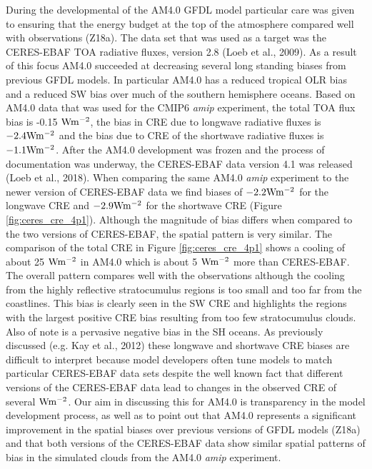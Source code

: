 \documentclass[draft]{agujournal2019}
\begin{document}
During the developmental of the AM4.0 GFDL model particular care was given to ensuring that the energy budget at 
the top of the atmosphere compared well with observations (Z18a).  The data set that was used as a target
was the CERES-EBAF TOA radiative fluxes, version 2.8 (Loeb et al., 2009).  
As a result of this focus AM4.0 succeeded at decreasing several long standing biases from previous GFDL models.  
In particular AM4.0 has a reduced tropical OLR bias and a reduced SW bias over much of the southern hemisphere oceans.   
Based on AM4.0 data that was used for the CMIP6 \textit{amip} experiment, the total TOA flux bias is -0.15 $ \rm{W m^{-2}}$,  %
the bias in CRE due to longwave radiative fluxes is $-2.4 \rm{W m^{-2}} $ and the bias due to CRE of the shortwave radiative fluxes   
is $-1.1 \rm{W m^{-2}} $.  
After the AM4.0 development was frozen and the process of documentation 
was underway, the CERES-EBAF data version 4.1 was released (Loeb et al., 2018).  When comparing the same 
AM4.0 \textit{amip} experiment to the 
newer version of CERES-EBAF data we find biases of $-2.2 \rm{W m^{-2}} $ for the longwave CRE and 
$-2.9 \rm{W m^{-2}} $ for the shortwave CRE (Figure \ref{fig:ceres_cre_4p1}).  Although the magnitude of bias 
differs when compared to the two versions of CERES-EBAF, the spatial pattern is very similar.   
The comparison of the total 
CRE in Figure \ref{fig:ceres_cre_4p1}  shows a cooling of about 25 $\rm{W m^{-2}}$ in AM4.0 which is about 
5 $\rm{W m^{-2}}$ more than CERES-EBAF.  The overall pattern compares
well with the observations although the cooling from the highly reflective stratocumulus regions is too small and
too far from the coastlines. 
This bias is clearly seen in the SW CRE and highlights the regions with the largest
positive CRE bias resulting from too few stratocumulus clouds.  Also of note is a pervasive negative bias in the SH oceans.   
  As previously discussed (e.g. Kay et al., 2012) these longwave and shortwave CRE 
biases are difficult to interpret because model developers often tune models to match particular CERES-EBAF data 
sets despite the well known fact that different versions of the CERES-EBAF data lead to changes in the observed CRE of
several $\rm{W m^{-2}}$.   Our aim in discussing this for AM4.0 is transparency in the model development process, 
as well as to point out that AM4.0 represents a significant improvement in the spatial biases over previous versions
of GFDL models (Z18a) and that both versions of the CERES-EBAF data show similar spatial patterns of bias in the 
simulated clouds  from the AM4.0 \textit{amip} experiment.   
\end{document}
